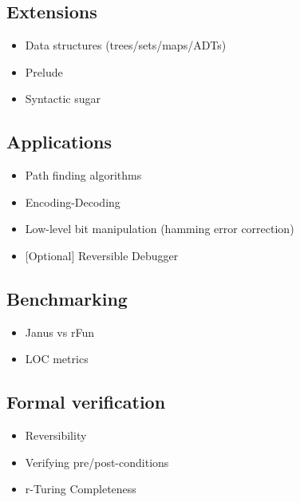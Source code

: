 \documentclass[12pt,a4paper]{article}
\begin{document}
	\subsection{Extensions}
	\begin{itemize}
		\item{Data structures (trees/sets/maps/ADTs)}
		\item{Prelude}
		\item{Syntactic sugar}
	\end{itemize}
	
	\subsection{Applications}
	\begin{itemize}
		\item{Path finding algorithms}
        \item{Encoding-Decoding}
        \item{Low-level bit manipulation (hamming error correction)}
        \item{[Optional] Reversible Debugger}
	\end{itemize}
	
	\subsection{Benchmarking}
	\begin{itemize}
		\item{Janus vs rFun}
		\item{LOC metrics}
	\end{itemize}
	
	\subsection{Formal verification}
	\begin{itemize}
		\item{Reversibility}
		\item{Verifying pre/post-conditions}
		\item{r-Turing Completeness}
	\end{itemize}
\end{document}
